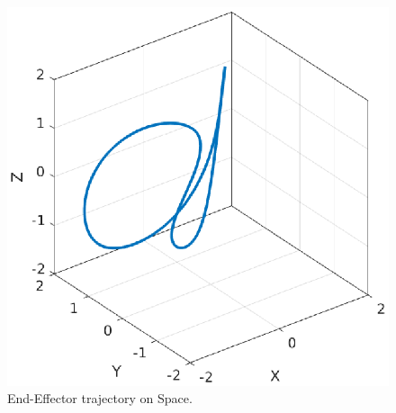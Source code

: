 \documentclass[a4paper,10pt]{article}
\begin{document}
\begin{figure}[H] \label{fig:}
 \centering
 \includegraphics[width=0.7\linewidth]{EndETraj3D.eps}
 \caption{End-Effector trajectory on Space.}
\end{figure}
\end{document}
